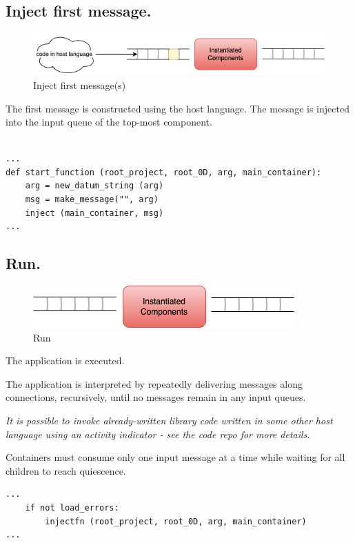 \documentclass[10pt,anonymous,review]{acmart}
\begin{document}
\subsection{Inject first message.}
  \begin{figure}
    \includegraphics[scale=0.4]{./media/inject.png}
    \caption{Inject first message(s)}
    \label{fig:inject_first_message}
  \end{figure}

The first message is constructed using the host language. The message is
injected\cite{main} into the input queue of the top-most component.

\begin{verbatim}

...
def start_function (root_project, root_0D, arg, main_container):
    arg = new_datum_string (arg)
    msg = make_message("", arg)
    inject (main_container, msg)
...
\end{verbatim}
  
\subsection{Run.}
  \begin{figure}
    \includegraphics[scale=0.4]{./media/run.png}
    \caption{Run}
    \label{fig:run}
  \end{figure}
The application is executed.

The application is interpreted by repeatedly delivering messages along
connections, recursively, until no messages remain in any input queues.

\emph{It is possible to invoke already-written library code written in some other host language using an activity indicator - see the code repo for more details.}

Containers must consume only one input message at a time while waiting
for all children to reach quiescence.

\begin{verbatim}
...
    if not load_errors:
        injectfn (root_project, root_0D, arg, main_container)
...
\end{verbatim}
  
\end{document}
